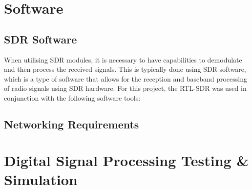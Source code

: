 \section{Software}

\subsection{SDR Software \label{sec:SDRsoftware}}
When utilising SDR modules, it is necessary to have capabilities to demodulate and then process the received signals. This is typically done using SDR software, which is a type of software that allows for the reception and baseband processing of radio signals using SDR hardware. For this project, the RTL-SDR was used in conjunction with the following software tools:


\subsection{Networking Requirements \label{sec:networking}}


\section{Digital Signal Processing Testing \& Simulation}



